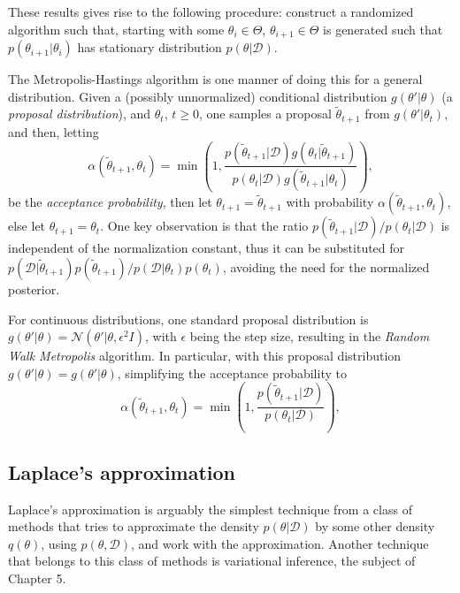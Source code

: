 These results gives rise to the following procedure: construct a randomized algorithm such that, starting with some $\theta_i \in \Theta$, $\theta_{i+1} \in \Theta$ is generated such that $p(\theta_{i+1}|\theta_i)$ has stationary distribution $p(\theta|\mathcal{D})$.

The Metropolis-Hastings algorithm is one manner of doing this for a general distribution. Given a (possibly unnormalized) conditional distribution $g(\theta'|\theta)$ (a \textit{proposal distribution}), and $\theta_t$, $t \geq 0$, one samples a proposal 
$\tilde{\theta}_{t+1}$ from $g(\theta'|\theta_t)$, and then, letting
\begin{equation}
 \alpha(\tilde{\theta}_{t+1},\theta_t) = 
  \min \left(1, \frac{p(\tilde{\theta}_{t+1}|\mathcal{D}) g(\theta_t|\tilde{\theta}_{t+1})}{p(\theta_t|\mathcal{D}) g(\tilde{\theta}_{t+1}|\theta_t)}\right),
\end{equation}
be the \textit{acceptance probability}, then let $\theta_{t+1} = \tilde{\theta}_{t+1}$ with probability $\alpha(\tilde{\theta}_{t+1},\theta_t)$, else let $\theta_{t+1} = \theta_t$. One key observation is that the ratio $p(\tilde{\theta}_{t+1}|\mathcal{D})/p(\theta_t|\mathcal{D})$ is independent of the normalization constant, thus it can be substituted for $p(\mathcal{D}|\tilde{\theta}_{t+1})p(\tilde{\theta}_{t+1})/p(\mathcal{D}|\theta_t)p(\theta_t)$, avoiding the need for the normalized posterior.

For continuous distributions, one standard proposal distribution is $g(\theta'|\theta) = \mathcal{N}(\theta'|\theta,\epsilon^2 I)$, with $\epsilon$ being the step size, resulting in the \textit{Random Walk Metropolis} algorithm. In particular, with this proposal distribution $g(\theta'|\theta) = g(\theta'|\theta)$, simplifying the acceptance probability to 
\begin{equation}
\alpha(\tilde{\theta}_{t+1},\theta_t) = 
\min \left(1, \frac{p(\tilde{\theta}_{t+1}|\mathcal{D})}{p(\theta_t|\mathcal{D})}\right),
\end{equation}

\subsection{Laplace's approximation}
Laplace's approximation \cite{Bishop_2007} is arguably the simplest technique from a class of methods that tries to approximate the density $p(\theta|\mathcal{D})$ by some other density $q(\theta)$, using $p(\theta,\mathcal{D})$, and work with the approximation. Another technique that belongs to this class of methods is variational inference, the subject of Chapter 5.

